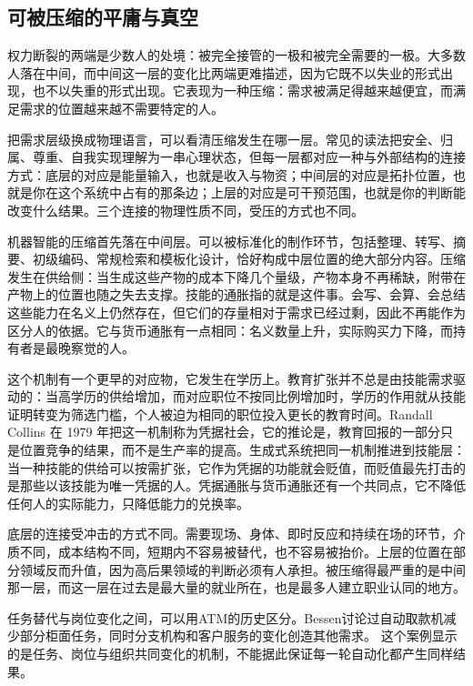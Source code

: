 \subsection{可被压缩的平庸与真空}

权力断裂的两端是少数人的处境：被完全接管的一极和被完全需要的一极。大多数人落在中间，而中间这一层的变化比两端更难描述，因为它既不以失业的形式出现，也不以失重的形式出现。它表现为一种压缩：需求被满足得越来越便宜，而满足需求的位置越来越不需要特定的人。


把需求层级换成物理语言，可以看清压缩发生在哪一层。常见的读法把安全、归属、尊重、自我实现理解为一串心理状态，但每一层都对应一种与外部结构的连接方式：底层的对应是能量输入，也就是收入与物资；中间层的对应是拓扑位置，也就是你在这个系统中占有的那条边；上层的对应是可干预范围，也就是你的判断能改变什么结果。三个连接的物理性质不同，受压的方式也不同。

机器智能的压缩首先落在中间层。可以被标准化的制作环节，包括整理、转写、摘要、初级编码、常规检索和模板化设计，恰好构成中层位置的绝大部分内容。压缩发生在供给侧：当生成这些产物的成本下降几个量级，产物本身不再稀缺，附带在产物上的位置也随之失去支撑。技能的通胀指的就是这件事。会写、会算、会总结这些能力在名义上仍然存在，但它们的存量相对于需求已经过剩，因此不再能作为区分人的依据。它与货币通胀有一点相同：名义数量上升，实际购买力下降，而持有者是最晚察觉的人。

这个机制有一个更早的对应物，它发生在学历上。教育扩张并不总是由技能需求驱动的：当高学历的供给增加，而对应职位不按同比例增加时，学历的作用就从技能证明转变为筛选门槛，个人被迫为相同的职位投入更长的教育时间。Randall Collins 在 1979 年把这一机制称为凭据社会，它的推论是，教育回报的一部分只是位置竞争的结果，而不是生产率的提高\cite{collins1979credential}。生成式系统把同一机制推进到技能层：当一种技能的供给可以按需扩张，它作为凭据的功能就会贬值，而贬值最先打击的是那些以该技能为唯一凭据的人。凭据通胀与货币通胀还有一个共同点，它不降低任何人的实际能力，只降低能力的兑换率。

底层的连接受冲击的方式不同。需要现场、身体、即时反应和持续在场的环节，介质不同，成本结构不同，短期内不容易被替代，也不容易被抬价。上层的位置在部分领域反而升值，因为高后果领域的判断必须有人承担。被压缩得最严重的是中间那一层，而这一层在过去是最大量的就业所在，也是最多人建立职业认同的地方。

任务替代与岗位变化之间，可以用ATM的历史区分。Bessen讨论过自动取款机减少部分柜面任务，同时分支机构和客户服务的变化创造其他需求。\cite{bessen2015learning} 这个案例显示的是任务、岗位与组织共同变化的机制，不能据此保证每一轮自动化都产生同样结果。

